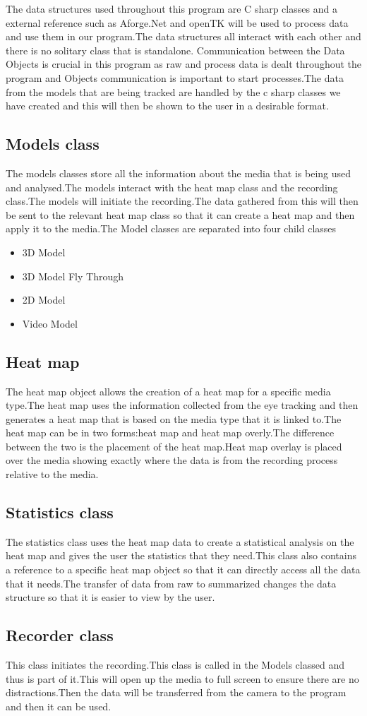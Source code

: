 The data structures used throughout this program are C sharp classes and a external reference such as Aforge.Net and openTK will be used to process data and use them in our program.The data structures all interact with each other and there is no solitary class that is standalone. Communication between the Data Objects is crucial in this program as raw and process data is dealt throughout the program and Objects communication is important to start processes.The data from the models that are being tracked are handled by the c sharp classes we have created and this will then be shown to the user in a desirable format.

\subsection{Models class}
The models classes store all the information about the media that is being used and analysed.The models interact with the heat map class and the recording class.The models will initiate the recording.The data gathered from this will then be sent to the relevant heat map class so that it can create a heat map and then apply it to the media.The Model classes are separated into four child classes
\begin{itemize}
\item 3D Model
\item 3D Model Fly Through
\item 2D Model
\item Video Model
\end{itemize}
\subsection{Heat map}
The heat map object allows the creation of a heat map for a specific media type.The heat map uses the information collected from the eye tracking and then generates a heat map that is based on the media type that it is linked to.The heat map can be in two forms:heat map and heat map overly.The difference between the two is the placement of the heat map.Heat map overlay is placed over the media showing exactly where the data is from the recording process relative to the media.
\subsection{Statistics class}
The statistics class uses the heat map data to create a statistical analysis on the heat map and gives the user the statistics that they need.This class also contains a reference to a specific heat map object so that it can directly access all the data that it needs.The transfer of data from raw to summarized changes the data structure so that it is easier to view by the user.
\subsection{Recorder class}
This class initiates the recording.This class is called in the Models classed and thus is part of it.This will open up the media to full screen to ensure there are no distractions.Then the data will be transferred from the camera to the program and then it can be used.